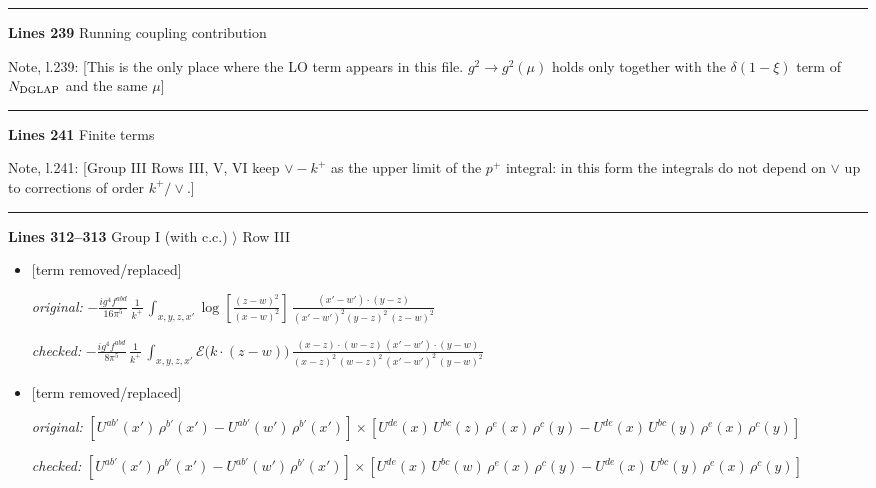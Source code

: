 \documentclass[10pt]{article}
\newenvironment{notebox}{\def\FrameCommand{{\color{notebar}\vrule width 1.5pt}\hspace{6pt}}\MakeFramed{\advance\hsize-\width\FrameRestore}\small}{\endMakeFramed}
\begin{document}
\noindent\rule{\linewidth}{0.3pt}\par\noindent\textbf{Lines 239} \quad \textsf{Running coupling contribution}\par
\begin{notebox}\textsf{\small Note, l.239:} [This is the only place where the LO term appears in this file. $g^{2}\to g^{2}(\mu)$ holds only together with the $\delta(1-\xi)$ term of $N_{\rm DGLAP}$ and the same $\mu$]\end{notebox}
\noindent\rule{\linewidth}{0.3pt}\par\noindent\textbf{Lines 241} \quad \textsf{Finite terms}\par
\begin{notebox}\textsf{\small Note, l.241:} [Group III Rows III, V, VI keep $\vee-k^{+}$ as the upper limit of the $p^{+}$ integral: in this form the integrals do not depend on $\vee$ up to corrections of order $k^{+}/\vee$.]\end{notebox}
\noindent\rule{\linewidth}{0.3pt}\par\noindent\textbf{Lines 312--313} \quad \textsf{Group I (with c.c.) $\rangle$ Row III} \par
\begin{itemize}[leftmargin=2.2em,itemsep=1pt,topsep=2pt]
\item[\textbf{l.312}] \textsf{\small [term removed/replaced]} \par\noindent\emph{original:} $\displaystyle -\frac{ig^{4}f^{abd}}{16\pi^{5}}\,\frac{1}{k^{+}}\,\int_{x,y,z,x'}\log{[\frac{(z-w)^{2}}{(x-w)^{2}}]}\,\frac{(x'-w')\cdot(y-z)}{(x'-w')^{2}(y-z)^{2}\,(z-w)^{2}}$\par\noindent\emph{checked:} $\displaystyle -\frac{ig^{4}f^{abd}}{8\pi^{5}}\,\frac{1}{k^{+}}\,\int_{x,y,z,x'}\mathcal{E}\big(k\cdot(z-w)\big)\,\frac{(x-z)\cdot(w-z)\,(x'-w')\cdot(y-w)}{(x-z)^{2}\,(w-z)^{2}\,(x'-w')^{2}\,(y-w)^{2}}$
\item[\textbf{l.312}] \textsf{\small [term removed/replaced]} \par\noindent\emph{original:} $\displaystyle [U^{ab'}(x')\,\rho^{b'}(x')-U^{ab'}(w')\, \rho^{b'}(x')]\times [U^{de}(x)\,U^{bc}(z)\, \rho^{e}(x)\,\rho^{c}(y)-U^{de}(x)\,U^{bc}(y)\,\rho^{e}(x)\,\rho^{c}(y)]$\par\noindent\emph{checked:} $\displaystyle [U^{ab'}(x')\,\rho^{b'}(x')-U^{ab'}(w')\, \rho^{b'}(x')]\times [U^{de}(x)\,U^{bc}(w)\, \rho^{e}(x)\,\rho^{c}(y)-U^{de}(x)\,U^{bc}(y)\,\rho^{e}(x)\,\rho^{c}(y)]$
\end{itemize}
\end{document}
